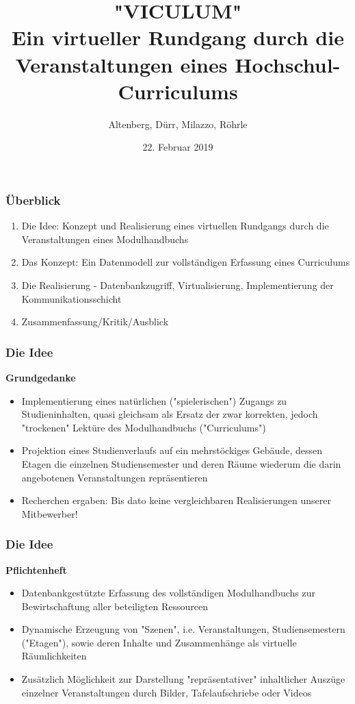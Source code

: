 \documentclass{beamer}
\title[Viculum]{"VICULUM" \\ Ein virtueller Rundgang durch die Veranstaltungen eines Hochschul-Curriculums } %
\author{Altenberg, Dürr, Milazzo, Röhrle}
\institute[]
{
Hochschule Albstadt-Sigmaringen \\ %
\medskip
\textit{Fabian Altenberg (WIN), altenbfa@hs-albsig.de} %
\newline
\textit{Maik Dürr (TI), duerrmai@hs-albsig.de} %
\newline
\textit{Domenico Milazzo (TI), milazzdo@hs-albsig.de} %
\newline
\textit{Prof. Dr. Jörg Röhrle, roehrle@hs-albsig.de} %
\newline
}
\date{22. Februar 2019} %
\begin{document}
\begin{frame}
\titlepage %
\end{frame}

\begin{frame}
\frametitle{Überblick}
\begin{enumerate}
\item Die Idee: Konzept und Realisierung eines virtuellen Rundgangs durch die Veranstaltungen eines Modulhandbuchs 
\item Das Konzept: Ein Datenmodell zur vollständigen Erfassung eines Curriculums 
\item Die Realisierung - Datenbankzugriff, Virtualisierung, Implementierung der Kommunikationsschicht
\item Zusammenfassung/Kritik/Ausblick
\end{enumerate}
\end{frame}


\begin{frame}
\frametitle{Die Idee}
\textbf{Grundgedanke}
\begin{itemize}
\item Implementierung eines natürlichen ("spielerischen") Zugangs zu Studieninhalten, quasi gleichsam als Ersatz der zwar korrekten, jedoch "trockenen" Lektüre des Modulhandbuchs ("Curriculums")
\item Projektion eines Studienverlaufs auf ein mehrstöckiges Gebäude, dessen Etagen die einzelnen Studiensemester und deren Räume wiederum die darin angebotenen Veranstaltungen repräsentieren 
\item Recherchen ergaben:  Bis dato keine vergleichbaren Realisierungen unserer Mitbewerber!
\end{itemize}
\end{frame}


\begin{frame}
\frametitle{Die Idee}
\textbf{Pflichtenheft}
\begin{itemize}
\item Datenbankgestützte Erfassung des vollständigen Modulhandbuchs zur Bewirtschaftung aller beteiligten Ressourcen 
\item Dynamische Erzeugung von "Szenen", i.e. Veranstaltungen, Studiensemestern ("Etagen"), sowie deren Inhalte und  Zusammenhänge als virtuelle Räumlichkeiten 
\item Zusätzlich Möglichkeit zur Darstellung "repräsentativer" inhaltlicher Auszüge einzelner Veranstaltungen durch Bilder, Tafelaufschriebe oder Videos
\end{itemize}
\end{frame}
\end{document}
